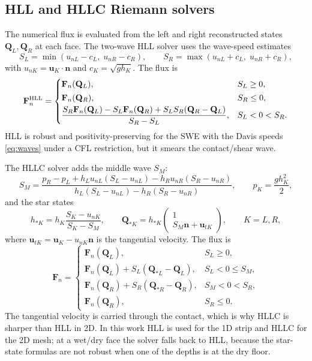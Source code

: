﻿\documentclass[11pt,a4paper]{article}
\newcommand{\bu}{\mathbf{u}}
\newcommand{\bn}{\mathbf{n}}
\newcommand{\bF}{\mathbf{F}}
\newcommand{\bQ}{\mathbf{Q}}
\begin{document}
\subsection{HLL and HLLC Riemann solvers}
The numerical flux is evaluated from the left and right reconstructed states
$\bQ_L,\bQ_R$ at each face.  The two-wave HLL solver \cite{harten1983} uses the
wave-speed estimates
\begin{equation}
  S_L=\min(u_{nL}-c_L,\;u_{nR}-c_R),\qquad
  S_R=\max(u_{nL}+c_L,\;u_{nR}+c_R),
  \label{eq:waves}
\end{equation}
with $u_{nK}=\bu_K\cdot\bn$ and $c_K=\sqrt{g h_K}$.  The flux is
\begin{equation}
  \bF^{\rm HLL}_n=
  \begin{cases}
    \bF_n(\bQ_L), & S_L\ge0,\\[2pt]
    \bF_n(\bQ_R), & S_R\le0,\\[2pt]
    \dfrac{S_R\bF_n(\bQ_L)-S_L\bF_n(\bQ_R)
      +S_LS_R(\bQ_R-\bQ_L)}{S_R-S_L}, & S_L<0<S_R .
  \end{cases}
  \label{eq:hll}
\end{equation}
HLL is robust and positivity-preserving for the SWE with the Davis speeds
\eqref{eq:waves} under a CFL restriction, but it smears the contact/shear wave.

The HLLC solver \cite{toro1994} adds the middle wave $S_M$:
\begin{equation}
  S_M=
  \frac{p_R-p_L+h_Lu_{nL}(S_L-u_{nL})-h_Ru_{nR}(S_R-u_{nR})}
       {h_L(S_L-u_{nL})-h_R(S_R-u_{nR})},
  \qquad p_K=\frac{g h_K^2}{2},
  \label{eq:sm}
\end{equation}
and the star states
\begin{equation}
  h_{*K}=h_K\frac{S_K-u_{nK}}{S_K-S_M},\qquad
  \bQ_{*K}=h_{*K}
  \begin{pmatrix}1\\ S_M\bn+\bu_{tK}\end{pmatrix},
  \qquad K=L,R,
  \label{eq:star}
\end{equation}
where $\bu_{tK}=\bu_K-u_{nK}\bn$ is the tangential velocity.  The flux is
\begin{equation}
  \bF_n=
  \begin{cases}
    \bF_n(\bQ_L), & S_L\ge0,\\
    \bF_n(\bQ_L)+S_L(\bQ_{*L}-\bQ_L), & S_L<0\le S_M,\\
    \bF_n(\bQ_R)+S_R(\bQ_{*R}-\bQ_R), & S_M<0<S_R,\\
    \bF_n(\bQ_R), & S_R\le0 .
  \end{cases}
  \label{eq:hllc}
\end{equation}
The tangential velocity is carried through the contact, which is why HLLC is
sharper than HLL in 2D.  In this work HLL is used for the 1D strip and HLLC
for the 2D mesh; at a wet/dry face the solver falls back to HLL, because the
star-state formulas are not robust when one of the depths is at the dry floor.
\end{document}
